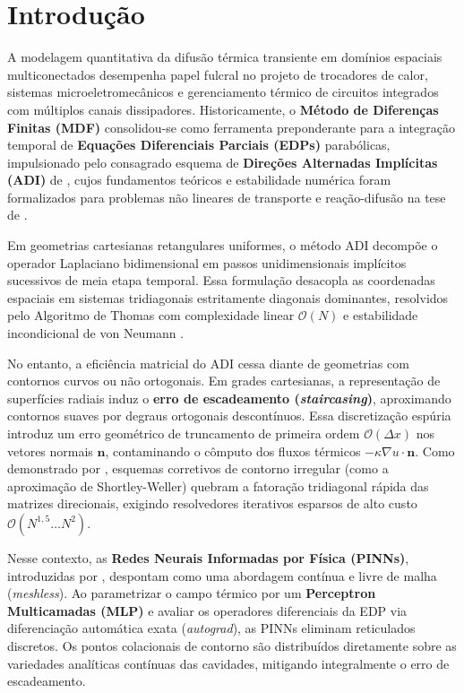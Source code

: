 \documentclass[a4paper, 12pt, twoside]{article}
\begin{document}

\section{Introdução}

A modelagem quantitativa da difusão térmica transiente em domínios espaciais multiconectados desempenha papel fulcral no projeto de trocadores de calor, sistemas microeletromecânicos e gerenciamento térmico de circuitos integrados com múltiplos canais dissipadores. Historicamente, o \textbf{Método de Diferenças Finitas (MDF)} consolidou-se como ferramenta preponderante para a integração temporal de \textbf{Equações Diferenciais Parciais (EDPs)} parabólicas, impulsionado pelo consagrado esquema de \textbf{Direções Alternadas Implícitas (ADI)} de \textcite{peaceman1955}, cujos fundamentos teóricos e estabilidade numérica foram formalizados para problemas não lineares de transporte e reação-difusão na tese de \textcite{pereira2019}.

Em geometrias cartesianas retangulares uniformes, o método ADI decompõe o operador Laplaciano bidimensional em passos unidimensionais implícitos sucessivos de meia etapa temporal. Essa formulação desacopla as coordenadas espaciais em sistemas tridiagonais estritamente diagonais dominantes, resolvidos pelo Algoritmo de Thomas com complexidade linear $\mathcal{O}(N)$ e estabilidade incondicional de von Neumann \parencite{peaceman1955, pereira2019}.

No entanto, a eficiência matricial do ADI cessa diante de geometrias com contornos curvos ou não ortogonais. Em grades cartesianas, a representação de superfícies radiais induz o \textbf{erro de escadeamento (\textit{staircasing})}, aproximando contornos suaves por degraus ortogonais descontínuos. Essa discretização espúria introduz um erro geométrico de truncamento de primeira ordem $\mathcal{O}(\Delta x)$ nos vetores normais $\mathbf{n}$, contaminando o cômputo dos fluxos térmicos $-\kappa \nabla u \cdot \mathbf{n}$. Como demonstrado por \textcite{pereira2019}, esquemas corretivos de contorno irregular (como a aproximação de Shortley-Weller) quebram a fatoração tridiagonal rápida das matrizes direcionais, exigindo resolvedores iterativos esparsos de alto custo $\mathcal{O}(N^{1{,}5} \dots N^2)$.

Nesse contexto, as \textbf{Redes Neurais Informadas por Física (PINNs)}, introduzidas por \textcite{raissi2019pinns}, despontam como uma abordagem contínua e livre de malha (\textit{meshless}). Ao parametrizar o campo térmico por um \textbf{Perceptron Multicamadas (MLP)} e avaliar os operadores diferenciais da EDP via diferenciação automática exata (\textit{autograd}), as PINNs eliminam reticulados discretos. Os pontos colacionais de contorno são distribuídos diretamente sobre as variedades analíticas contínuas das cavidades, mitigando integralmente o erro de escadeamento.
\end{document}
